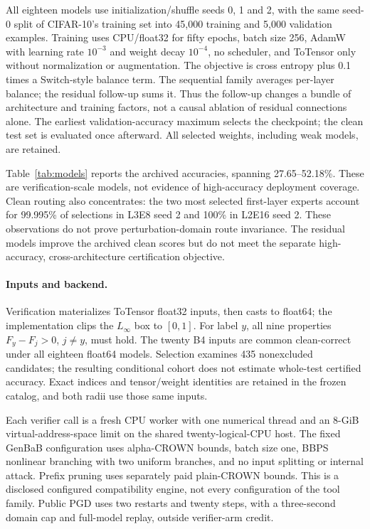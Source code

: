 \documentclass[11pt]{article}
\begin{document}
All eighteen models use initialization/shuffle seeds 0, 1 and 2, with the same
seed-0 split of CIFAR-10's training set into 45,000 training and 5,000 validation
examples. Training uses CPU/float32 for fifty epochs, batch size 256, AdamW
with learning rate $10^{-3}$ and weight decay $10^{-4}$, no scheduler, and
ToTensor only without normalization or augmentation. The objective is cross
entropy plus 0.1 times a Switch-style balance term. The sequential family
averages per-layer balance; the residual follow-up sums it. Thus the follow-up
changes a bundle of architecture and training factors, not a causal ablation
of residual connections alone. The earliest validation-accuracy maximum selects
the checkpoint; the clean test set is evaluated once afterward. All selected
weights, including weak models, are retained.

Table~\ref{tab:models} reports the archived accuracies, spanning 27.65--52.18\%.
These are verification-scale models, not evidence of high-accuracy deployment
coverage. Clean routing also concentrates: the two most selected first-layer
experts account for 99.995\% of selections in L3E8 seed 2 and 100\% in L2E16
seed 2. These observations do not prove perturbation-domain route invariance.
The residual models improve the archived clean scores but do not meet the
separate high-accuracy, cross-architecture certification objective.

\paragraph{Inputs and backend.}
Verification materializes ToTensor float32 inputs, then casts to float64;
the implementation clips the $L_\infty$ box to $[0,1]$. For label $y$, all nine
properties $F_y-F_j>0$, $j\ne y$, must hold. The twenty B4 inputs are common
clean-correct under all eighteen float64 models. Selection examines 435
nonexcluded candidates; the resulting conditional cohort does not estimate
whole-test certified accuracy. Exact indices and tensor/weight identities are
retained in the frozen catalog, and both radii use those same inputs.

Each verifier call is a fresh CPU worker with one numerical thread and an
8-GiB virtual-address-space limit on the shared twenty-logical-CPU host.
The fixed GenBaB configuration uses alpha-CROWN bounds, batch size one, BBPS
nonlinear branching with two uniform branches, and no input splitting or
internal attack. Prefix pruning uses separately paid plain-CROWN bounds.
This is a disclosed configured compatibility engine, not every configuration
of the tool family. Public PGD uses two restarts and twenty steps, with a
three-second domain cap and full-model replay, outside verifier-arm credit.
\end{document}
